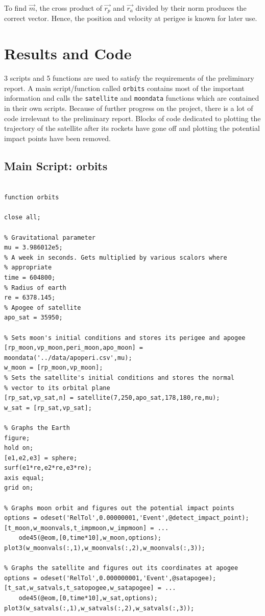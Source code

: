 \documentclass{article}
\begin{document}
To find $\vec{m}$, the cross product of $\vec{r_p}$ and $\vec{r_a}$
divided by their norm produces the correct vector. Hence, the position
and velocity at perigee is known for later use.

\section{Results and Code}

3 scripts and 5 functions are used to satisfy the requirements of
the preliminary report. A main script/function called \verb[orbits[
contains most of the important information and calls the
\verb[satellite[ and \verb[moondata[ functions which are contained in
their own scripts. Because of further progress on the project, there
is a lot of code irrelevant to the preliminary report. Blocks of code
dedicated to plotting the trajectory of the satellite after its
rockets have gone off and plotting the potential impact points have
been removed.

\subsection{Main Script: orbits}

\begin{verbatim}
  
function orbits

close all;

% Gravitational parameter
mu = 3.986012e5;
% A week in seconds. Gets multiplied by various scalors where
% appropriate
time = 604800;
% Radius of earth
re = 6378.145;
% Apogee of satellite
apo_sat = 35950;

% Sets moon's initial conditions and stores its perigee and apogee
[rp_moon,vp_moon,peri_moon,apo_moon] = moondata('../data/apoperi.csv',mu);
w_moon = [rp_moon,vp_moon];
% Sets the satellite's initial conditions and stores the normal
% vector to its orbital plane
[rp_sat,vp_sat,n] = satellite(7,250,apo_sat,178,180,re,mu);
w_sat = [rp_sat,vp_sat];

% Graphs the Earth
figure;
hold on;
[e1,e2,e3] = sphere;
surf(e1*re,e2*re,e3*re);
axis equal;
grid on;

% Graphs moon orbit and figures out the potential impact points
options = odeset('RelTol',0.00000001,'Event',@detect_impact_point);
[t_moon,w_moonvals,t_impmoon,w_impmoon] = ...
    ode45(@eom,[0,time*10],w_moon,options);
plot3(w_moonvals(:,1),w_moonvals(:,2),w_moonvals(:,3));

% Graphs the satellite and figures out its coordinates at apogee
options = odeset('RelTol',0.000000001,'Event',@satapogee);
[t_sat,w_satvals,t_satopogee,w_satapogee] = ...
    ode45(@eom,[0,time*10],w_sat,options);
plot3(w_satvals(:,1),w_satvals(:,2),w_satvals(:,3));
\end{verbatim}
\end{document}
